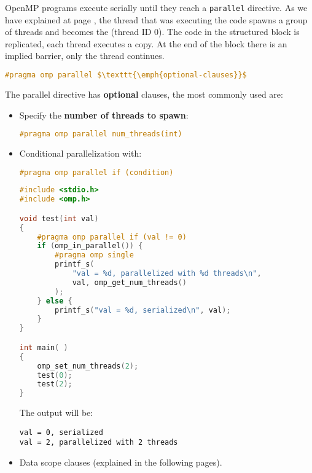 \highspace
OpenMP programs execute serially until they reach a \texttt{parallel} directive. As we have explained at page \pageref{figure: how OpenMP works}, the thread that was executing the code spawns a group of  threads and becomes the  (thread ID 0). The code in the structured block is replicated, each thread executes a copy. At the end of the block there is an implied barrier, only the  thread continues.
\begin{openmpbox}
\begin{lstlisting}[language=C++, mathescape=true]
#pragma omp parallel $\texttt{\emph{optional-clauses}}$\end{lstlisting}
\end{openmpbox}

\noindent
The parallel directive has \textbf{optional} clauses, the most commonly used are:
\begin{itemize}
    \item Specify the \textbf{number of threads to spawn}:
    \begin{lstlisting}[language=C++]
#pragma omp parallel num_threads(int)\end{lstlisting}

    \item Conditional parallelization with:
\begin{lstlisting}[language=C++]
#pragma omp parallel if (condition)\end{lstlisting}
    \begin{examplebox}
\begin{lstlisting}[language=C++]
#include <stdio.h>
#include <omp.h>

void test(int val)
{
    #pragma omp parallel if (val != 0)
    if (omp_in_parallel()) {
        #pragma omp single
        printf_s(
            "val = %d, parallelized with %d threads\n",
            val, omp_get_num_threads()
        );
    } else {
        printf_s("val = %d, serialized\n", val);
    }
}

int main( )
{
    omp_set_num_threads(2);
    test(0);
    test(2);
}\end{lstlisting}
    The output will be:
\begin{lstlisting}
val = 0, serialized
val = 2, parallelized with 2 threads\end{lstlisting}
    \end{examplebox}

    \item Data scope clauses (explained in the following pages).
\end{itemize}
